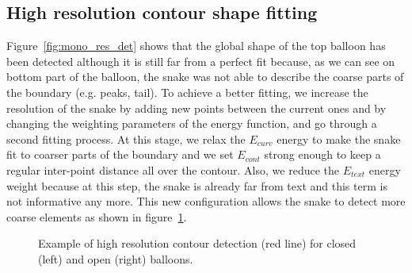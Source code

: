 \documentclass[conference]{IEEEtran}
\begin{document}
\subsection{High resolution contour shape fitting}
Figure~\ref{fig:mono_res_det} shows that the global shape of the top balloon has been detected although it is still far from a perfect fit because, as we can see on bottom part of the balloon, the snake was not able to describe the coarse parts of the boundary (e.g. peaks, tail). To achieve a better fitting, we increase the resolution of the snake by adding new points between the current ones and by changing the weighting parameters of the energy function, and go through a second fitting process. At this stage, we relax the $E_{curv}$ energy to make the snake fit to coarser parts of the boundary and we set $E_{cont}$ strong enough to keep a regular inter-point distance all over the contour. Also, we reduce the $E_{text}$ energy weight because at this step, the snake is already far from text and this term is not informative any more. %
This new configuration allows the snake to detect more coarse elements as shown in figure~\ref{fig:hd_contour}.


	\begin{figure}[!ht]	%
	  \centering
		\caption{Example of high resolution contour detection (red line) for closed (left) and open (right) balloons.}
		\label{fig:hd_contour}
	\end{figure}
\end{document}
